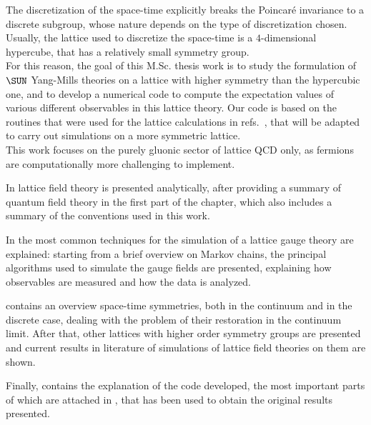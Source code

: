 The discretization of the space-time explicitly breaks the Poincar\'e invariance to a discrete subgroup, whose nature depends on the type of discretization chosen.
Usually, the lattice used to discretize the space-time is a $4$-dimensional hypercube, that has a relatively small symmetry group.\\
For this reason, the goal of this M.Sc. thesis work is to study the formulation of $\SUN$ Yang-Mills theories on a lattice with higher symmetry than the hypercubic one, and to develop a numerical code to compute the expectation values of various different observables in this lattice theory.
Our code is based on the routines that were used for the lattice calculations in refs.~\cite{Panero:2009tv,Mykkanen:2012ri}, that will be adapted to carry out simulations on a more symmetric lattice.\\
This work focuses on the purely gluonic sector of lattice QCD only, as fermions are computationally more challenging to implement.

In  lattice field theory is presented analytically, after providing a summary of quantum field theory in the first part of the chapter, which also includes a summary of the conventions used in this work.

In  the most common techniques for the  simulation of a lattice gauge theory are explained: starting from a brief overview on Markov chains, the principal algorithms used to simulate the gauge fields are presented, explaining how observables are measured and how the data is analyzed.

 contains an overview space-time symmetries, both in the continuum and in the discrete case, dealing with the problem of their restoration in the continuum limit.
After that, other lattices with higher order symmetry groups are presented and current results in literature of simulations of lattice field theories on them are shown.

Finally,  contains the explanation of the code developed, the most important parts of which are attached in , that has been used to obtain the original results presented.
